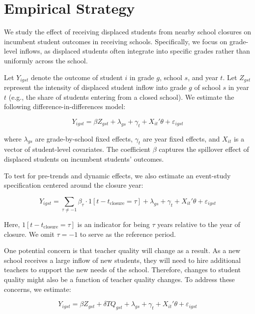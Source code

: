 \section*{Empirical Strategy}

We study the effect of receiving displaced students from nearby school closures on incumbent student outcomes in receiving schools. Specifically, we focus on grade-level inflows, as displaced students often integrate into specific grades rather than uniformly across the school.

Let $Y_{igst}$ denote the outcome of student $i$ in grade $g$, school $s$, and year $t$. Let $Z_{gst}$ represent the intensity of displaced student inflow into grade $g$ of school $s$ in year $t$ (e.g., the share of students entering from a closed school). We estimate the following difference-in-differences model:

\begin{equation}
Y_{igst} = \beta Z_{gst} + \lambda_{gs} + \gamma_t + X_{it}'\theta + \varepsilon_{igst}
\end{equation}

where $\lambda_{gs}$ are grade-by-school fixed effects, $\gamma_t$ are year fixed effects, and $X_{it}$ is a vector of student-level covariates. The coefficient $\beta$ captures the spillover effect of displaced students on incumbent students' outcomes.

To test for pre-trends and dynamic effects, we also estimate an event-study specification centered around the closure year:

\begin{equation}
Y_{igst} = \sum_{\tau \neq -1} \beta_\tau \cdot 1[t - t_{\text{closure}} = \tau] + \lambda_{gs} + \gamma_t + X_{it}'\theta + \varepsilon_{igst}
\end{equation}

Here, $1[t - t_{\text{closure}} = \tau]$ is an indicator for being $\tau$ years relative to the year of closure. We omit $\tau = -1$ to serve as the reference period.

One potential concern is that teacher quality will change as a result. As a new school receives a large inflow of new students, they will need to hire additional teachers to support the new needs of the school. Therefore, changes to student quality might also be a function of teacher quality changes. To address these concerns, we estimate:

\begin{equation}
Y_{igst} = \beta Z_{gst} + \delta TQ_{gst} + \lambda_{gs} + \gamma_t + X_{it}'\theta + \varepsilon_{igst}
\end{equation}

